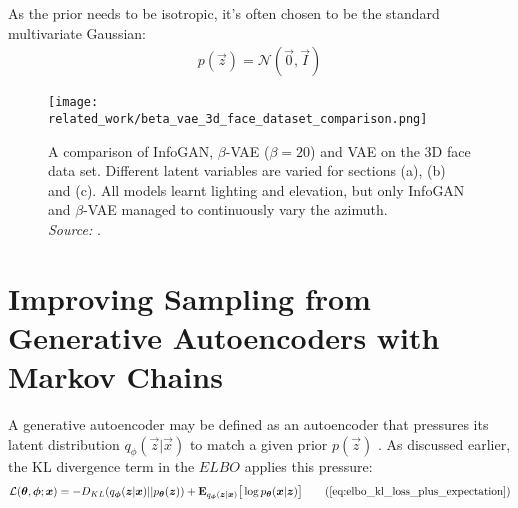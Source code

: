 As the prior needs to be isotropic, it's often chosen to be the standard multivariate Gaussian:
\begin{align}
p(\vec{z}) = \mathcal{N}(\vec{0}, \vec{I})
\end{align}

\begin{figure}[h!]
\centering
\captionsetup{justification=centering}
\texttt{[image: related\_work/beta\_vae\_3d\_face\_dataset\_comparison.png]}
\caption{A comparison of InfoGAN, $\beta$-VAE ($\beta = 20$) and VAE on the 3D face data set. Different latent variables are varied for sections (a), (b) and (c). All models learnt lighting and elevation, but only InfoGAN and $\beta$-VAE managed to continuously vary the azimuth.\\ \textit{Source:} \cite{Thiagarajan2016}.}
\label{fig:beta_vae_3d_face_dataset_comparison}
\end{figure}



%
%
%
%
%
\section{Improving Sampling from Generative Autoencoders with Markov Chains}

A generative autoencoder may be defined as an autoencoder that pressures its latent distribution $q_{\phi}(\vec{z} | \vec{x})$ to match a given prior $p(\vec{z})$ \cite{Creswell2016}. As discussed earlier, the KL divergence term in the $ELBO$ applies this pressure:
\begin{align}
\mathcal{L}(\vec{\theta}, \vec{\phi}; \vec{x}) = -D_{KL}(q_{\vec{\phi}}(\vec{z}|\vec{x}) || p_{\vec{\theta}}(\vec{z})) + \mathbf{E}_{q_{\vec{\phi}}(\vec{z}|\vec{x})}\big[\log p_{\vec{\theta}}(\vec{x} | \vec{z}) \big]
\tag{\ref{eq:elbo_kl_loss_plus_expectation}}
\end{align}

